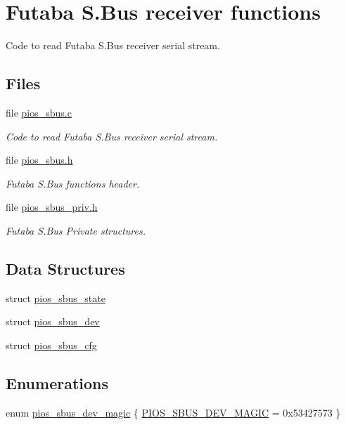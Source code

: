 \hypertarget{group___p_i_o_s___s_bus}{\section{Futaba S.\-Bus receiver functions}
\label{group___p_i_o_s___s_bus}
}


Code to read Futaba S.\-Bus receiver serial stream.  


\subsection*{Files}
\begin{DoxyCompactItemize}
\item 
file \hyperlink{pios__sbus_8c}{pios\-\_\-sbus.\-c}
\begin{DoxyCompactList}\small\item\em Code to read Futaba S.\-Bus receiver serial stream. \end{DoxyCompactList}\item 
file \hyperlink{pios__sbus_8h}{pios\-\_\-sbus.\-h}
\begin{DoxyCompactList}\small\item\em Futaba S.\-Bus functions header. \end{DoxyCompactList}\item 
file \hyperlink{pios__sbus__priv_8h}{pios\-\_\-sbus\-\_\-priv.\-h}
\begin{DoxyCompactList}\small\item\em Futaba S.\-Bus Private structures. \end{DoxyCompactList}\end{DoxyCompactItemize}
\subsection*{Data Structures}
\begin{DoxyCompactItemize}
\item 
struct \hyperlink{structpios__sbus__state}{pios\-\_\-sbus\-\_\-state}
\item 
struct \hyperlink{structpios__sbus__dev}{pios\-\_\-sbus\-\_\-dev}
\item 
struct \hyperlink{structpios__sbus__cfg}{pios\-\_\-sbus\-\_\-cfg}
\end{DoxyCompactItemize}
\subsection*{Enumerations}
\begin{DoxyCompactItemize}
\item 
enum \hyperlink{group___p_i_o_s___s_bus_ga595ee1f903af9c4166426f9cc144b36c}{pios\-\_\-sbus\-\_\-dev\-\_\-magic} \{ \hyperlink{group___p_i_o_s___s_bus_gga595ee1f903af9c4166426f9cc144b36ca326080b9f0c57625a4ce55bd5cd91d66}{P\-I\-O\-S\-\_\-\-S\-B\-U\-S\-\_\-\-D\-E\-V\-\_\-\-M\-A\-G\-I\-C} = 0x53427573
 \}
\end{DoxyCompactItemize}
